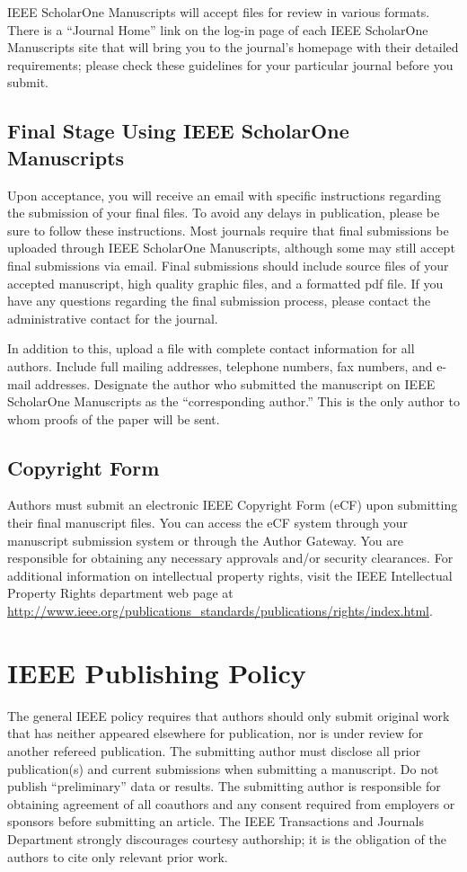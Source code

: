 \documentclass[journal,twoside,web]{ieeecolor}
\begin{document}
IEEE ScholarOne Manuscripts will accept files for review in various formats. There is a ``Journal Home'' link on the log-in page of each IEEE ScholarOne Manuscripts site that will bring you to the journal's homepage with their detailed requirements; please check these guidelines for your particular journal before you submit.

\subsection{Final Stage Using IEEE ScholarOne Manuscripts}
Upon acceptance, you will receive an email with specific instructions
regarding the submission of your final files. To avoid any delays in
publication, please be sure to follow these instructions. Most journals
require that final submissions be uploaded through IEEE ScholarOne Manuscripts,
although some may still accept final submissions via email. Final
submissions should include source files of your accepted manuscript, high
quality graphic files, and a formatted pdf file. If you have any questions
regarding the final submission process, please contact the administrative
contact for the journal.

In addition to this, upload a file with complete contact information for all
authors. Include full mailing addresses, telephone numbers, fax numbers, and
e-mail addresses. Designate the author who submitted the manuscript on
IEEE ScholarOne Manuscripts as the ``corresponding author.'' This is the only
author to whom proofs of the paper will be sent.

\subsection{Copyright Form}
Authors must submit an electronic IEEE Copyright Form (eCF) upon submitting 
their final manuscript files. You can access the eCF system through your 
manuscript submission system or through the Author Gateway. You are 
responsible for obtaining any necessary approvals and/or security 
clearances. For additional information on intellectual property rights, 
visit the IEEE Intellectual Property Rights department web page at 
\underline{http://www.ieee.org/publications\_standards/publications/rights/}\discretionary{}{}{}\underline{index.html}.

\section*{IEEE Publishing Policy}
The general IEEE policy requires that authors should only submit original 
work that has neither appeared elsewhere for publication, nor is under 
review for another refereed publication. The submitting author must disclose 
all prior publication(s) and current submissions when submitting a 
manuscript. Do not publish ``preliminary'' data or results. The submitting 
author is responsible for obtaining agreement of all coauthors and any 
consent required from employers or sponsors before submitting an article. 
The IEEE Transactions and Journals Department strongly discourages courtesy 
authorship; it is the obligation of the authors to cite only relevant prior 
work.
\end{document}
